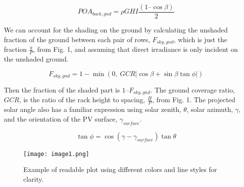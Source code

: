 \documentclass[conference]{IEEEtran}
\begin{document}
\begin{equation}
POA_{back,gnd} = \rho GHI \frac{\left(1 – \cos \beta \right)}{2}
\end{equation}

We can account for the shading on the ground by calculating the unshaded fraction of the ground between each pair of rows, $F_{sky,gnd}$, which is just the fraction $\frac{y}{P}$, from Fig. 1, and assuming that direct irradiance is only incident on the unshaded ground.

\begin{equation}
F_{sky,gnd} = 1 - \min(0,\ GCR \left| \cos \beta + \sin \beta \tan \phi \right|)
\end{equation}

Then the fraction of the shaded part is $1 – F_{sky,gnd}$.  The ground coverage ratio, $GCR$, is the ratio of the rack height to spacing, $\frac{H}{P}$, from Fig. 1.  The projected solar angle also has a familiar expression using solar zenith, $\theta$, solar azimuth, $\gamma$, and the orientation of the PV surface, $\gamma_{surface}$.

\begin{equation}
\tan \phi = \cos \left(\gamma - \gamma_{surface} \right) \tan \theta
\end{equation}



\begin{figure}
\centering
\texttt{[image: image1.png]}
\caption{Example of readable plot using different colors and line styles for clarity.}
\end{figure}
\end{document}
